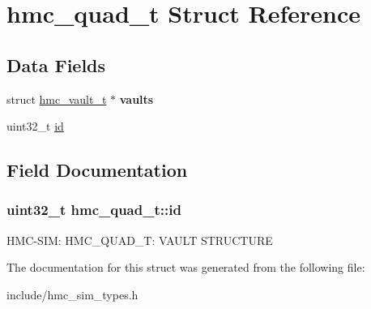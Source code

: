 \hypertarget{structhmc__quad__t}{\section{hmc\-\_\-quad\-\_\-t Struct Reference}
\label{structhmc__quad__t}
}
\subsection*{Data Fields}
\begin{DoxyCompactItemize}
\item 
\hypertarget{structhmc__quad__t_aecf435c5296822d32f0290bf66d5daba}{struct \hyperlink{structhmc__vault__t}{hmc\-\_\-vault\-\_\-t} $\ast$ {\bfseries vaults}}\label{structhmc__quad__t_aecf435c5296822d32f0290bf66d5daba}

\item 
uint32\-\_\-t \hyperlink{structhmc__quad__t_ac94f470ec6f4729b452f2aae902f3e53}{id}
\end{DoxyCompactItemize}


\subsection{Field Documentation}
\hypertarget{structhmc__quad__t_ac94f470ec6f4729b452f2aae902f3e53}{
\subsubsection[{id}]{\setlength{\rightskip}{0pt plus 5cm}uint32\-\_\-t hmc\-\_\-quad\-\_\-t\-::id}}\label{structhmc__quad__t_ac94f470ec6f4729b452f2aae902f3e53}
H\-M\-C-\/\-S\-I\-M\-: H\-M\-C\-\_\-\-Q\-U\-A\-D\-\_\-\-T\-: V\-A\-U\-L\-T S\-T\-R\-U\-C\-T\-U\-R\-E 

The documentation for this struct was generated from the following file\-:\begin{DoxyCompactItemize}
\item 
include/hmc\-\_\-sim\-\_\-types.\-h\end{DoxyCompactItemize}
